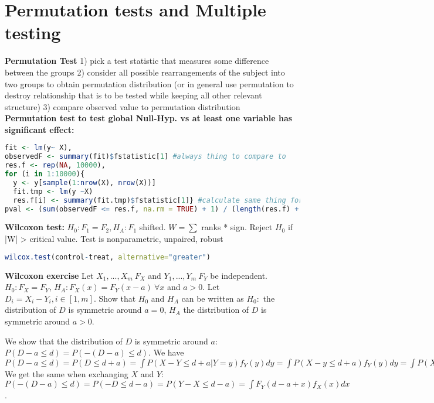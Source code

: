 \section{Permutation tests and Multiple testing}
\textbf{Permutation Test} 1) pick a test statistic that measures some difference between the groups 2) consider all possible rearrangements of the subject into two groups to obtain permutation distribution (or in general use permutation to destroy relationship that is to be tested while keeping all other relevant structure) 3) compare observed value to permutation distribution \\
\textbf{Permutation test to test global Null-Hyp. vs at least one variable has significant effect:}
\begin{lstlisting}[language=R]
fit <- lm(y~ X),
observedF <- summary(fit)$fstatistic[1] #always thing to compare to
res.f <- rep(NA, 10000),
for (i in 1:10000){
  y <- y[sample(1:nrow(X), nrow(X))]
  fit.tmp <- lm(y ~X)
  res.f[i] <- summary(fit.tmp)$fstatistic[1]} #calculate same thing for permutations
pval <- (sum(observedF <= res.f, na.rm = TRUE) + 1) / (length(res.f) + 1)#see how many permutations larger/smaller than orig\end{lstlisting}

\textbf{Wilcoxon test: } $H_0: F_1 = F_2, H_A: F_1$ shifted. $W = \sum$ ranks * sign. Reject $H_0$ if |W| > critical value.
Test is nonparametric, unpaired, robust 
\begin{lstlisting}[language=R]
wilcox.test(control-treat, alternative="greater")
\end{lstlisting} 
\textbf{Wilcoxon exercise}
Let $X_1,...,X_m~F_X$ and $Y_1,...,Y_m~F_Y$ be independent. $H_0: F_X=F_Y$, $H_A: F_X(x) = F_Y(x-a) \  \forall x$ and $a>0$. Let $D_i = X_i - Y_i, i \in [1,m]$. Show that $H_0$ and $H_A$ can be written as $H_0: $ the distribution of $D$ is symmetric around $a=0$, $H_A$ the distribution of $D$ is symmetric around $a>0$.

We show that the distribution of $D$ is symmetric around $a$: $P(D-a \leq d) = P(-(D-a) \leq d)$. We have $P(D-a \leq d) = P(D \leq d + a) = \int P(X-Y \leq d+a |Y=y) f_Y(y) dy = \int P(X-y \leq d+a) f_Y(y) dy = \int P(X \leq d+a+y) f_Y(y) dy = \int F_X(d+a+y)f_Y(y)dy$ We get the same when exchanging $X$ and $Y$: $P(-(D-a)\leq d) = P(-D \leq d-a) = P(Y-X \leq d-a) = \int F_Y(d-a+x)f_X(x)dx$.

